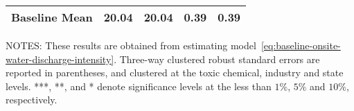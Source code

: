 \begin{table}[H]
{\begin{tabular}{@{}lllll@{}}
            Baseline Mean      & 20.04     & 20.04     & 0.39      & 0.39      \\ \bottomrule\bottomrule
        \end{tabular}%
    }
    \begin{minipage}{18cm}
        \vspace{0.05in}
        NOTES: These results are obtained from estimating model~\ref{eq:baseline-onsite-water-discharge-intensity}. Three-way clustered robust standard errors are reported in parentheses, and clustered at the toxic chemical, industry and state levels. ***, **, and * denote significance levels at the less than $1\%$, $5\%$ and $10\%$, respectively.
    \end{minipage}
\end{table}